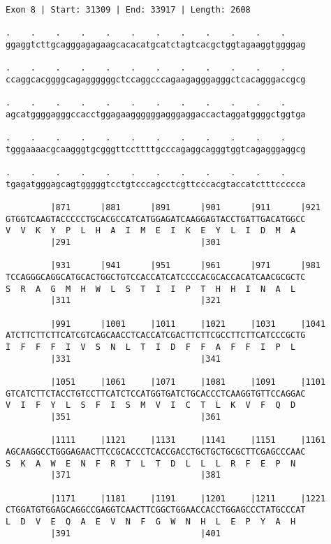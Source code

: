 \documentclass{article}
\begin{document}
\newpage
\begin{Verbatim}
Exon 8 | Start: 31309 | End: 33917 | Length: 2608
 
.    .    .    .    .    .    .    .    .    .    .    .    
ggaggtcttgcagggagagaagcacacatgcatctagtcacgctggtagaaggtggggag
  
.    .    .    .    .    .    .    .    .    .    .    .    
ccaggcacggggcagaggggggctccaggcccagaagagggagggctcacagggaccgcg
  
.    .    .    .    .    .    .    .    .    .    .    .    
agcatggggagggccacctggagaaggggggagggaggaccactaggatggggctggtga
  
.    .    .    .    .    .    .    .    .    .    .    .    
tgggaaaacgcaagggtgcgggttccttttgcccagaggcagggtggtcagagggaggcg
  
.    .    .    .    .    .    .    .    .    .    .    .    
tgagatgggagcagtgggggtcctgtcccagcctcgttcccacgtaccatctttccccca
  
         |871      |881      |891      |901      |911      |921
GTGGTCAAGTACCCCCTGCACGCCATCATGGAGATCAAGGAGTACCTGATTGACATGGCC
V  V  K  Y  P  L  H  A  I  M  E  I  K  E  Y  L  I  D  M  A  
         |291                          |301                 
  
         |931      |941      |951      |961      |971      |981
TCCAGGGCAGGCATGCACTGGCTGTCCACCATCATCCCCACGCACCACATCAACGCGCTC
S  R  A  G  M  H  W  L  S  T  I  I  P  T  H  H  I  N  A  L  
         |311                          |321                 
  
         |991      |1001     |1011     |1021     |1031     |1041
ATCTTCTTCTTCATCGTCAGCAACCTCACCATCGACTTCTTCGCCTTCTTCATCCCGCTG
I  F  F  F  I  V  S  N  L  T  I  D  F  F  A  F  F  I  P  L  
         |331                          |341                 
  
         |1051     |1061     |1071     |1081     |1091     |1101
GTCATCTTCTACCTGTCCTTCATCTCCATGGTGATCTGCACCCTCAAGGTGTTCCAGGAC
V  I  F  Y  L  S  F  I  S  M  V  I  C  T  L  K  V  F  Q  D  
         |351                          |361                 
  
         |1111     |1121     |1131     |1141     |1151     |1161
AGCAAGGCCTGGGAGAACTTCCGCACCCTCACCGACCTGCTGCTGCGCTTCGAGCCCAAC
S  K  A  W  E  N  F  R  T  L  T  D  L  L  L  R  F  E  P  N  
         |371                          |381                 
  
         |1171     |1181     |1191     |1201     |1211     |1221
CTGGATGTGGAGCAGGCCGAGGTCAACTTCGGCTGGAACCACCTGGAGCCCTATGCCCAT
L  D  V  E  Q  A  E  V  N  F  G  W  N  H  L  E  P  Y  A  H  
         |391                          |401                 
  

\end{Verbatim}
\end{document}
